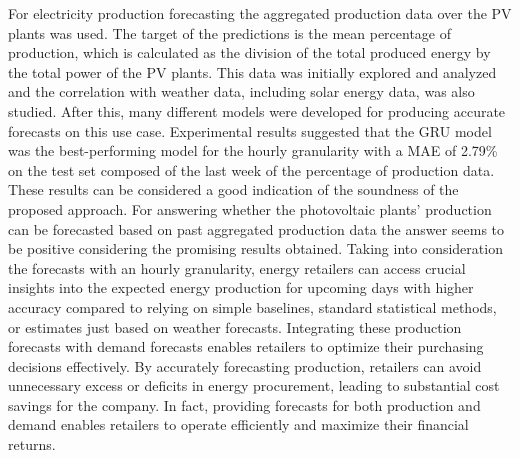 For electricity production forecasting the aggregated production data over the PV plants was used.
The target of the predictions is the mean percentage of production, which is calculated as the division of the total produced energy by the total power of the PV plants.
This data was initially explored and analyzed and the correlation with weather data, including solar energy data, was also studied.
After this, many different models were developed for producing accurate forecasts on this use case.
Experimental results suggested that the GRU model was the best-performing model for the hourly granularity with a MAE of 2.79\% on the test set composed of the last week of the percentage of production data.
These results can be considered a good indication of the soundness of the proposed approach.
For answering whether the photovoltaic plants' production can be forecasted based on past aggregated production data the answer seems to be positive considering the promising results obtained.
Taking into consideration the forecasts with an hourly granularity, energy retailers can access crucial insights into the expected energy production for upcoming days with higher accuracy compared to relying on simple baselines, standard statistical methods, or estimates just based on weather forecasts.
Integrating these production forecasts with demand forecasts enables retailers to optimize their purchasing decisions effectively.
By accurately forecasting production, retailers can avoid unnecessary excess or deficits in energy procurement, leading to substantial cost savings for the company.
In fact, providing forecasts for both production and demand enables retailers to operate efficiently and maximize their financial returns.

